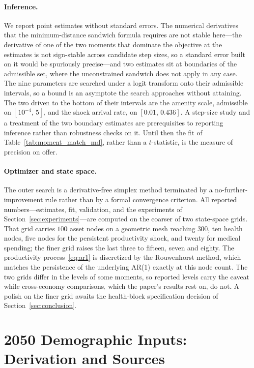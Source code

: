\documentclass[12pt,a4paper]{article}
\begin{document}
\begin{appendices}
\paragraph{Inference.} We report point estimates without standard errors. The numerical derivatives that the minimum-distance sandwich formula requires are not stable here---the derivative of one of the two moments that dominate the objective at the estimates is not sign-stable across candidate step sizes, so a standard error built on it would be spuriously precise---and two estimates sit at boundaries of the admissible set, where the unconstrained sandwich does not apply in any case. The nine parameters are searched under a logit transform onto their admissible intervals, so a bound is an asymptote the search approaches without attaining. The two driven to the bottom of their intervals are the amenity scale, admissible on $[10^{-4},\,5]$, and the shock arrival rate, on $[0.01,\,0.436]$. A step-size study and a treatment of the two boundary estimates are prerequisites to reporting inference rather than robustness checks on it. Until then the fit of Table~\ref{tab:moment_match_md}, rather than a $t$-statistic, is the measure of precision on offer.

\paragraph{Optimizer and state space.} The outer search is a derivative-free simplex method terminated by a no-further-improvement rule rather than by a formal convergence criterion. All reported numbers---estimates, fit, validation, and the experiments of Section~\ref{sec:experiments}---are computed on the coarser of two state-space grids. That grid carries $100$ asset nodes on a geometric mesh reaching $300$, ten health nodes, five nodes for the persistent productivity shock, and twenty for medical spending; the finer grid raises the last three to fifteen, seven and eighty. The productivity process~\eqref{eq:ar1} is discretized by the Rouwenhorst method, which matches the persistence of the underlying AR(1) exactly at this node count. The two grids differ in the levels of some moments, so reported levels carry the caveat while cross-economy comparisons, which the paper's results rest on, do not. A polish on the finer grid awaits the health-block specification decision of Section~\ref{sec:conclusion}.

\section{2050 Demographic Inputs: Derivation and Sources}
\label{app:demog2050}


\end{appendices}
\end{document}
